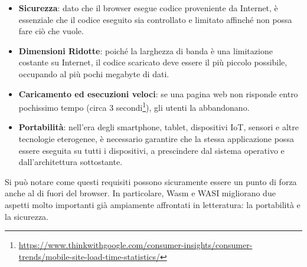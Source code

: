 \begin{itemize}
    \item \textbf{Sicurezza}: dato che il browser esegue codice proveniente da Internet, è essenziale che il codice
    eseguito sia controllato e limitato affinché non possa fare ciò che vuole.
    \item \textbf{Dimensioni Ridotte}: poiché la larghezza di banda è una limitazione costante su Internet, il codice
    scaricato deve essere il più piccolo possibile, occupando al più pochi megabyte di dati.
    \item \textbf{Caricamento ed esecuzioni veloci}: se una pagina web non risponde entro pochissimo tempo (circa 3
    secondi\footnote{\url{https://www.thinkwithgoogle.com/consumer-insights/consumer-trends/mobile-site-load-time-statistics/}}),
    gli utenti la abbandonano.
    \item \textbf{Portabilità}: nell'era degli smartphone, tablet, dispositivi IoT, sensori e altre tecnologie
    eterogenee, è necessario garantire che la stessa applicazione possa essere eseguita su tutti i dispositivi, a
    prescindere dal sistema operativo e dall'architettura sottostante.
\end{itemize}

Si può notare come questi requisiti possono sicuramente essere un punto di forza anche al di fuori del browser. In
particolare, Wasm e WASI migliorano due aspetti molto importanti già ampiamente affrontati in letteratura: la
portabilità e la sicurezza.

